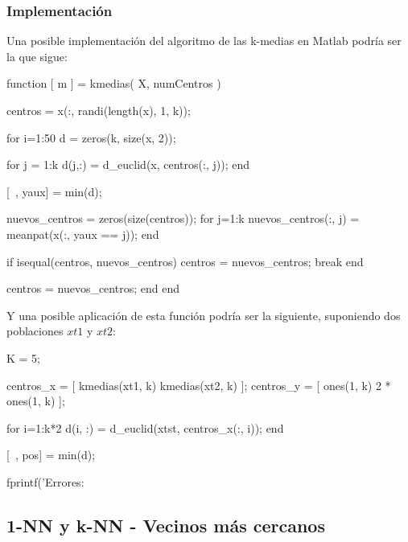 \documentclass[11pt]{scrartcl}
\begin{document}
\subsubsection{Implementación}

Una posible implementación del algoritmo de las k-medias en Matlab podría ser la
que sigue:

\begin{matlabcode}
function [ m ] = kmedias( X, numCentros )

centros = x(:, randi(length(x), 1, k));

for i=1:50    
    d = zeros(k, size(x, 2));

    for j = 1:k
        d(j,:) = d_euclid(x, centros(:, j));
    end
    
    [~, yaux] = min(d);
    
    nuevos_centros = zeros(size(centros));
    for j=1:k       
        nuevos_centros(:, j) = meanpat(x(:, yaux == j));
    end
    
    if isequal(centros, nuevos_centros)
        centros = nuevos_centros;
        break
    end
    
    centros = nuevos_centros;
end
end
\end{matlabcode}

Y una posible aplicación de esta función podría ser la siguiente, suponiendo
dos poblaciones $xt1$ y $xt2$:

\begin{matlabcode}
K = 5;

centros_x = [ kmedias(xt1, k) kmedias(xt2, k) ];
centros_y = [ ones(1, k) 2 * ones(1, k) ];

for i=1:k*2
   d(i, :) = d_euclid(xtst, centros_x(:, i)); 
end

[~, pos] = min(d);

fprintf('Errores: %
\end{matlabcode}

\subsection{1-NN y k-NN - Vecinos más cercanos}
\end{document}

